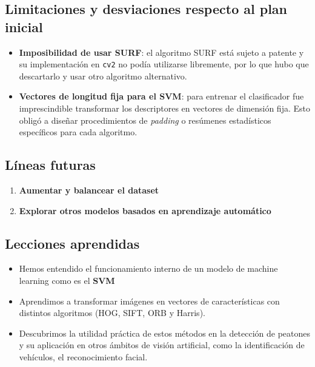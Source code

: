 \documentclass[a4paper]{article}
\begin{document}
\subsection{Limitaciones y desviaciones respecto al plan inicial}

\begin{itemize}
    \item \textbf{Imposibilidad de usar SURF}: el algoritmo SURF está sujeto a patente y su implementación en \texttt{cv2} no podía utilizarse libremente, por lo que hubo que descartarlo y usar otro algoritmo alternativo.
    
    \item \textbf{Vectores de longitud fija para el SVM}: para entrenar el clasificador fue imprescindible transformar los descriptores en vectores de dimensión fija. Esto obligó a diseñar procedimientos de \emph{padding} o resúmenes estadísticos específicos para cada algoritmo.
\end{itemize}


\subsection{Líneas futuras}

\begin{enumerate}
    \item \textbf{Aumentar y balancear el dataset}
    \item \textbf{Explorar otros modelos basados en aprendizaje automático}
\end{enumerate}

\subsection{Lecciones aprendidas}

\begin{itemize}
    \item Hemos entendido el funcionamiento interno de un modelo de machine learning como es el \textbf{SVM}
    
    \item Aprendimos a transformar imágenes en vectores de características con distintos algoritmos (HOG, SIFT, ORB y Harris).
        
    \item Descubrimos la utilidad práctica de estos métodos en la detección de peatones y su aplicación en otros ámbitos de visión artificial, como la identificación de vehículos, el reconocimiento facial.
\end{itemize}
\end{document}
